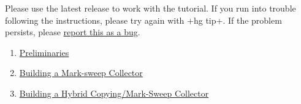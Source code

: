 \documentclass[a4paper]{book}
\begin{document}
Please use the latest release to work with the tutorial. If you run into trouble following the instructions, please try again with \spverb+hg tip+. If the problem persists, please \href{http://www.jikesrvm.org/ReportingBugs/}{report this as a bug}.

\begin{enumerate}
\item \hyperref[sec:preliminaries]{Preliminaries}
\item \hyperref[sec:buildingamarksweepcollector]{Building a Mark-sweep Collector}
\item \hyperref[sec:buildingahybridcollector]{Building a Hybrid Copying/Mark-Sweep Collector}
\end{enumerate}






\end{document}
